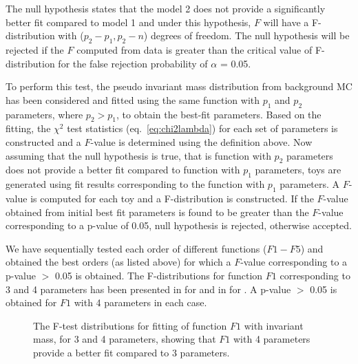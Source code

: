 The null hypothesis states that the model 2 does not provide a significantly better fit compared to model 1 and under this hypothesis, $F$ will have a
F-distribution with ($p_{2} - p_{1}, p_{2} - n$) degrees of freedom. The null hypothesis will be rejected if the $F$ computed from data is greater than the
critical value of F-distribution for the false rejection probability of $\alpha$ = 0.05.

To perform this test, the pseudo invariant mass distribution from background MC has been considered and fitted using the same function with $p_{1}$ and
$p_{2}$ parameters, where $p_{2} > p_{1}$, to obtain the best-fit parameters. Based on the fitting, the $\chi^{2}$ test statistics (eq.~\ref{eq:chi2lambda})
for each set of parameters is constructed and a $F$-value is determined using the definition above.
Now assuming that the null hypothesis is true, that is function with $p_{2}$ parameters
does not provide a better fit compared to function with $p_{1}$ parameters, toys are generated using fit results corresponding to the function with $p_{1}$ parameters.
A $F$-value is computed for each toy and a F-distribution is constructed. If the $F$-value obtained from initial best fit parameters
is found to be greater than the $F$-value corresponding to a p-value of 0.05, null hypothesis is rejected, otherwise accepted.

We have sequentially tested each order of different functions ($F1 - F5$) and obtained the best orders (as listed above) for which a $F$-value
corresponding to a p-value $>$ 0.05 is obtained. The F-distributions for function $F1$ corresponding to 3 and 4 parameters has been presented in
\fig{\ref{fig:ftest_q}} for \qstar and in \fig{\ref{fig:ftest_b}} for \bstar. A p-value $>$ 0.05 is obtained for $F1$ with 4 parameters in each case.

\vspace{-0.2in}
\begin{figure}[htpb]
\begin{center}
\caption{The F-test distributions for fitting of function $F1$ with \qstar invariant mass, for 3 and 4 parameters, showing that $F1$ with 4 parameters provide a better fit compared to 3 parameters.}
\label{fig:ftest_q}
\end{center}
\end{figure}
\vspace{-0.2in}

